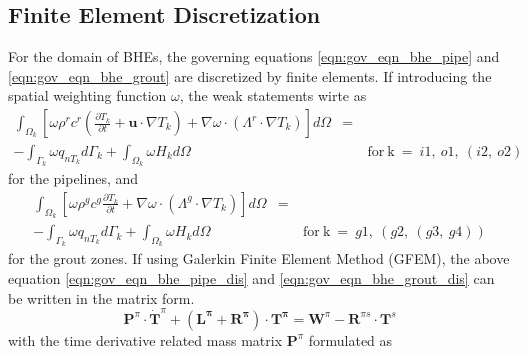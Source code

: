 \subsection{Finite Element Discretization}
For the domain of BHEs, the governing equations \ref{eqn:gov_eqn_bhe_pipe} and \ref{eqn:gov_eqn_bhe_grout} are discretized by finite elements. If introducing the spatial weighting function $\omega$, the weak statements wirte as
\begin{eqnarray}
\label{eqn:gov_eqn_bhe_pipe_dis}
\int_{\Omega_k} \left[ \omega \rho^r c^r \left( \frac{\partial T_k}{\partial t} + \bm{u} \cdot \nabla T_k \right) + \nabla \omega \cdot \left( \Lambda^r \cdot \nabla T_k \right) \right] d\Omega &=&~ \nonumber\\
-\int_{\Gamma_k} \omega q_{nT_k} d\Gamma_k + \int_{\Omega_k} \omega H_k d\Omega &~& \mathrm{~for~k~}=~i1,~o1,~(i2,~o2)
\end{eqnarray}
for the pipelines, and 
\begin{eqnarray}
\label{eqn:gov_eqn_bhe_grout_dis}
\int_{\Omega_k} \left[ \omega \rho^g c^g \frac{\partial T_k}{\partial t} + \nabla \omega \cdot \left( \Lambda^g \cdot \nabla T_k \right) \right] d\Omega &=&~ \nonumber\\
-\int_{\Gamma_k} \omega q_{nT_k} d\Gamma_k + \int_{\Omega_k} \omega H_k d\Omega &~& \mathrm{~for~k~}=~g1,~(g2,~(g3,~g4))
\end{eqnarray}
for the grout zones. If using Galerkin Finite Element Method (GFEM), the above equation \ref{eqn:gov_eqn_bhe_pipe_dis} and \ref{eqn:gov_eqn_bhe_grout_dis} can be written in the matrix form. 
\begin{equation}
\label{eqn:gov_eqn_bhe_matrix}
\bm{P}^\pi \cdot \bm{\dot{T}}^\pi + ( \bm{L^\pi} + \bm{R^\pi} ) \cdot \bm{T^\pi} = \bm{W}^\pi - \bm{R}^{\pi s} \cdot \bm{T}^{s}
\end{equation}
with the time derivative related mass matrix $\bm{P}^\pi$ formulated as
